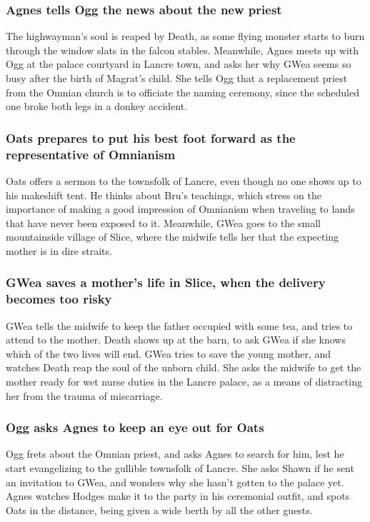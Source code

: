 \subsubsection{\Gls{Agnes} tells \Gls{Ogg} the news about the new priest}
The highwayman's soul is reaped by \Gls{Death}, as some flying monster starts to burn through the
window slats in the falcon stables. Meanwhile, \Gls{Agnes} meets up with \Gls{Ogg} at the palace
courtyard in Lancre town, and asks her why \Gls{GWea} seems so busy after the birth of
\Gls{Magrat}'s child. She tells \Gls{Ogg} that a replacement priest from the Omnian church is to
officiate the naming ceremony, since the scheduled one broke both legs in a donkey accident.

\subsubsection{\Gls{Oats} prepares to put his best foot forward as the representative of Omnianism}
\Gls{Oats} offers a sermon to the townsfolk of Lancre, even though no one shows up to his makeshift
tent. He thinks about \Gls{Bru}'s teachings, which stress on the importance of making a good
impression of Omnianism when traveling to lands that have never been exposed to it. Meanwhile,
\Gls{GWea} goes to the small mountainside village of Slice, where the midwife tells her that the
expecting mother is in dire straits.

\subsubsection{\Gls{GWea} saves a mother's life in Slice, when the delivery becomes too risky}
\Gls{GWea} tells the midwife to keep the father occupied with some tea, and tries to attend to the
mother. \Gls{Death} shows up at the barn, to ask \Gls{GWea} if she knows which of the two lives
will end. \Gls{GWea} tries to save the young mother, and watches \Gls{Death} reap the soul of the
unborn child. She asks the midwife to get the mother ready for wet nurse duties in the Lancre
palace, as a means of distracting her from the trauma of miscarriage.

\subsubsection{\Gls{Ogg} asks \Gls{Agnes} to keep an eye out for \Gls{Oats}}
\Gls{Ogg} frets about the Omnian priest, and asks \Gls{Agnes} to search for him, lest he start
evangelizing to the gullible townsfolk of Lancre. She asks \Gls{Shawn} if he sent an invitation to
\Gls{GWea}, and wonders why she hasn't gotten to the palace yet. \Gls{Agnes} watches \Gls{Hodges}
make it to the party in his ceremonial outfit, and spots \Gls{Oats} in the distance, being given a
wide berth by all the other guests.


